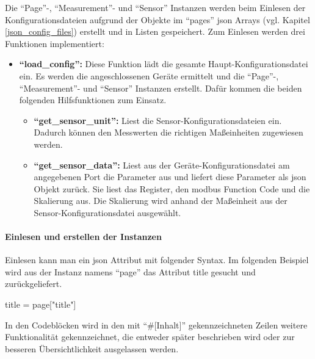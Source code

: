 Die \enquote{Page}-, \enquote{Measurement}- und \enquote{Sensor} Instanzen werden beim Einlesen der Konfigurationsdateien aufgrund der Objekte im \enquote{pages} \acs{json} Arrays (vgl. Kapitel \ref{json_config_files}) erstellt und in Listen gespeichert. \newline
Zum Einlesen werden drei Funktionen implementiert:
\begin{itemize}
	\item \textbf{\enquote{load\_config}:} Diese Funktion lädt die gesamte Haupt-Konfigurationsdatei ein. Es werden die angeschlossenen Geräte ermittelt und die \enquote{Page}-, \enquote{Measurement}- und \enquote{Sensor} Instanzen erstellt. Dafür kommen die beiden folgenden Hilfsfunktionen zum Einsatz.
    \begin{itemize}
		\item \textbf{\enquote{get\_sensor\_unit}:} Liest die Sensor-Konfigurationsdateien ein. Dadurch können den Messwerten die richtigen Maßeinheiten zugewiesen werden.
		\item \textbf{\enquote{get\_sensor\_data}:} Liest aus der Geräte-Konfigurationsdatei am angegebenen Port die Parameter aus und liefert diese Parameter als \acs{json} Objekt zurück. Sie liest das Register, den \gls{modbus} Function Code und die Skalierung aus. Die Skalierung wird anhand der Maßeinheit aus der Sensor-Konfigurationsdatei ausgewählt.
	\end{itemize}
\end{itemize}

\paragraph{Einlesen und erstellen der Instanzen}
Einlesen kann man ein \acs{json} Attribut mit folgender Syntax. Im folgenden Beispiel wird aus der Instanz namens \enquote{page} das Attribut title gesucht und zurückgeliefert.
\begin{pythoncode}
title = page["title"]
\end{pythoncode}

In den Codeblöcken wird in den mit \enquote{\#[Inhalt]} gekennzeichneten Zeilen weitere Funktionalität gekennzeichnet, die entweder später beschrieben wird oder zur besseren Übersichtlichkeit ausgelassen werden. 


